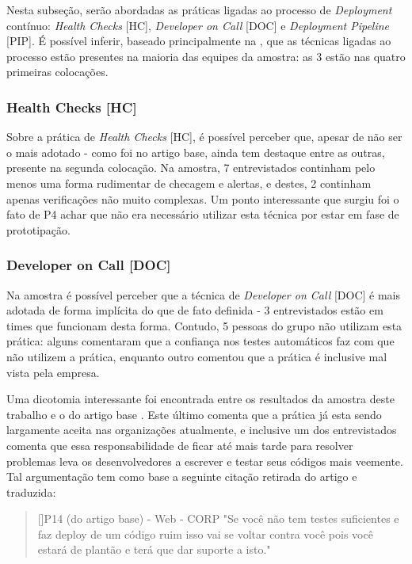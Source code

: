 Nesta subseção, serão abordadas as práticas ligadas ao processo de \emph{Deployment} contínuo: \emph{Health Checks} [HC], \emph{Developer on Call} [DOC] e \emph{Deployment Pipeline} [PIP]. É possível inferir, baseado principalmente na , que as técnicas ligadas ao processo estão presentes na maioria das equipes da amostra: as 3 estão nas quatro primeiras colocações. 

\subsubsection{Health Checks [HC]}

Sobre a prática de \emph{Health Checks} [HC], é possível perceber que, apesar de não ser o mais adotado - como foi no artigo base, ainda tem destaque entre as outras, presente na segunda colocação. Na amostra, 7 entrevistados continham pelo menos uma forma rudimentar de checagem e alertas, e destes, 2 continham apenas verificações não muito complexas. Um ponto interessante que surgiu foi o fato de P4 achar que não era necessário utilizar esta técnica por estar em fase de prototipação.

\subsubsection{Developer on Call [DOC]}

Na amostra é possível perceber que a técnica de \emph{Developer on Call} [DOC] é mais adotada de forma implícita do que de fato definida - 3 entrevistados estão em times que funcionam desta forma. Contudo, 5 pessoas do grupo não utilizam esta prática: alguns comentaram que a confiança nos testes automáticos faz com que não utilizem a prática, enquanto outro comentou que a prática é inclusive mal vista pela empresa.

Uma dicotomia interessante foi encontrada entre os resultados da amostra deste trabalho e o do artigo base \cite{empiricalStudy2016}. Este último comenta que a prática já esta sendo largamente aceita nas organizações atualmente, e inclusive um dos entrevistados comenta que essa responsabilidade de ficar até mais tarde para resolver problemas leva os desenvolvedores a escrever e testar seus códigos mais veemente. Tal argumentação tem como base a seguinte citação retirada do artigo e traduzida:

\begin{quotation}[]{P14 (do artigo base) - Web - CORP}
    "Se você não tem testes suficientes e faz deploy de um código ruim isso vai se voltar contra você pois você estará de plantão e terá que dar suporte a isto."
\end{quotation}

